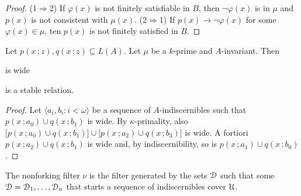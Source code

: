\documentclass{amsproc}
\begin{document}
\begin{proof}
  (1$\Rightarrow$2) If $\varphi(x)$ is not finitely satisfiable in $B$, then $\neg\varphi(x)$ is in $\mu$ and $p(x)$ is not consistent with $\mu(x)$.
  (2$\Rightarrow$1) If $p(x)\rightarrow\neg\varphi(x)$ for some $\varphi(x)\in\mu$, ten $p(x)$ is not finitely satisfied in $B$.
\end{proof}

\begin{theorem}
  Let $p(x\,;z), q(x\,;z)\subseteq L(A)$.
  Let $\mu$ be a $k$-prime and $A$-invariant.
  Then 

   is wide

  is a stable relation.
\end{theorem}

\begin{proof}
  Let $\langle a_i,b_i: i<\omega\rangle$ be a sequence of $A$-indiscernibles such that $p(x\,;a_0)\cup q(x\,;b_1)$ is wide.
  By $\kappa$-primality, also $\big[p(x\,;a_0)\cup q(x\,;b_1)\big]\cup\big[p(x\,;a_2)\cup q(x\,;b_3)\big]$ is wide.
  A fortiori $p(x\,;a_2)\cup q(x\,;b_1)$ is wide and, by indiscernibility, so is $p(x\,;a_1)\cup q(x\,;b_0)$.
\end{proof}

\begin{definition}
  The nonforking filter $\nu$ is the filter generated by the sets $\EuScript D$ such that some $\EuScript D=\EuScript D_1,\dots,\EuScript D_n$ that starts a sequence of indiscernibles cover $\EuScript U$.
\end{definition}
\end{document}

